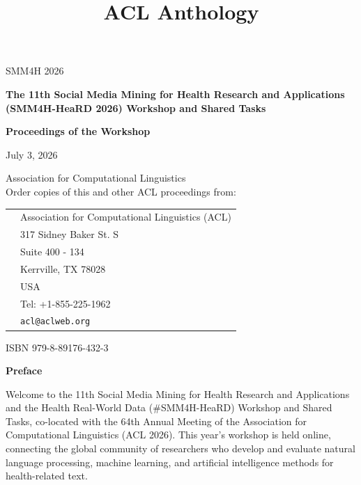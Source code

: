 \documentclass[11pt,oneside]{book}
\date{}
\title{ACL Anthology}
\begin{document}
\begin{titlepage}
  \begin{center}
    \vspace{1.5cm}

    {\LARGE SMM4H 2026}

    \vspace*{65mm}

    {\bf\LARGE The 11th Social Media Mining for Health Research and Applications (SMM4H-HeaRD 2026) Workshop and Shared Tasks}

    \vspace*{5cm}

    {\bf\LARGE Proceedings of the Workshop}

    \vfill

    {\LARGE July 3, 2026}
  \end{center}
\end{titlepage}
\newpage



{}
\vspace*{11cm}
{\large

\noindent
{} Association for Computational Linguistics\\

\vspace*{2cm}
\noindent
Order copies of this and other ACL proceedings from:

\vspace*{1cm}
\begin{tabular}{p{1.5cm}l}
& Association for Computational Linguistics (ACL)\\
& 317 Sidney Baker St. S \\
& Suite 400 - 134\\
& Kerrville, TX 78028\\
& USA\\
& Tel: +1-855-225-1962\\
&{\tt acl@aclweb.org}\\
\end{tabular}

\vspace*{1cm}
ISBN 979-8-89176-432-3
}
\newpage


  \begin{center}
   { \Large \textbf{Preface}}
  \end{center}
  \vspace*{0.5cm}
  Welcome to the 11th Social Media Mining for Health Research and Applications and the Health Real-World Data (\#SMM4H-HeaRD) Workshop and Shared Tasks, co-located with the 64th Annual Meeting of the Association for Computational Linguistics (ACL 2026). This year’s workshop is held online, connecting the global community of researchers who develop and evaluate natural language processing, machine learning, and artificial intelligence methods for health-related text.
\par\vspace{1em}
\end{document}
